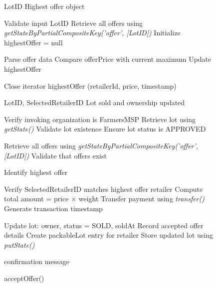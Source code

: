\documentclass[12pt]{article}
\begin{document}
	
		\begin{figure}[h]
		\centering
		\caption{Offer Selection and Acceptance Mechanisms}
		\label{fig:offer_selection_acceptance}
		
		\begin{minipage}[t]{0.48\linewidth}
			\vspace{0pt}
			\centering
			\begin{algorithm}[H]
				\caption{getHighestOfferForLot()}
				\begin{algorithmic}[1]
					
					\Require LotID
					\Ensure Highest offer object
					
					\State Validate input LotID
					\State Retrieve all offers using \textit{getStateByPartialCompositeKey('offer', [LotID])}
					\State Initialize highestOffer = null
					
					\State Parse offer data
					\State Compare offerPrice with current maximum
					\State Update highestOffer
					\EndIf
					\EndFor
					
					\State Close iterator
					\State \Return highestOffer (retailerId, price, timestamp)
					
				\end{algorithmic}
			\end{algorithm}
		\end{minipage}
		\hfill
		\begin{minipage}[t]{0.48\linewidth}
			\vspace{0pt}
			\centering
			\begin{algorithm}[H]
				\caption{acceptOffer()}
				\begin{algorithmic}[1]
					
					\Require LotID, SelectedRetailerID
					\Ensure Lot sold and ownership updated
					
					\State Verify invoking organization is FarmersMSP
					\State Retrieve lot using \textit{getState()}
					\State Validate lot existence
					\State Ensure lot status is APPROVED
					
					\State Retrieve all offers using \textit{getStateByPartialCompositeKey('offer', [LotID])}
					\State Validate that offers exist
					
					\For{each offer}
					\State Identify highest offer
					\EndFor
					
					\State Verify SelectedRetailerID matches highest offer retailer
					\State Compute total amount = price $\times$ weight
					\State Transfer payment using \textit{transfer()}
					\State Generate transaction timestamp
					
					\State Update lot: owner, status = SOLD, soldAt
					\State Record accepted offer details
					\State Create packableLot entry for retailer
					\State Store updated lot using \textit{putState()}
					
					\State \Return confirmation message
					
				\end{algorithmic}
			\end{algorithm}
		\end{minipage}
		
	\end{figure}
	
\end{document}
